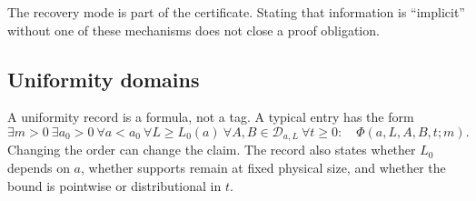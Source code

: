 The recovery mode is part of the certificate.  Stating that information is
``implicit'' without one of these mechanisms does not close a proof
obligation.

\subsection{Uniformity domains}

A uniformity record is a formula, not a tag.  A typical entry has the form
\[
 \exists m>0\ \exists a_0>0\ \forall a<a_0\
 \forall L\geq L_0(a)\ \forall A,B\in\mathcal D_{a,L}\
 \forall t\geq0:\quad \Phi(a,L,A,B,t;m).
\]
Changing the order can change the claim.  The record also states whether
$L_0$ depends on $a$, whether supports remain at fixed physical size, and
whether the bound is pointwise or distributional in $t$.
